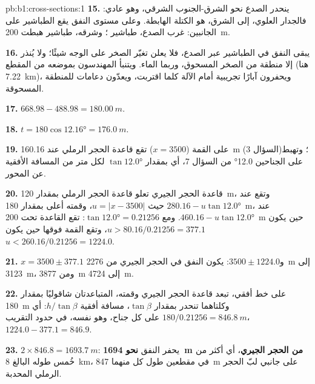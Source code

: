 \begin{solution}{pb:b1:cross-sections:1}
\textbf{15.} ينحدر الصدع نحو الشرق-الجنوب الشرقي، وهو عادي: فالجدار العلوي، إلى الشرق، هو الكتلة الهابطة. وعلى مستوى النفق يقع الطباشير على الجانبين: غرب الصدع، طباشير ؛ وشرقه، طباشير هبطت \qty{200}{m}.

\textbf{16.} يبقى النفق في الطباشير عبر الصدع، فلا يعلن تغيّر الصخر على الوجه شيئًا؛ ولا يُنذر إلا منطقة من الصخر المسحوق، وربما الماء. ويتنبأ المهندسون بموضعه من المقطع (هنا \qty{7.22}{km})، ويحفرون آبارًا تجريبية أمام الآلة كلما اقتربت، ويعدّون دعامات للمنطقة المسحوقة.

\textbf{17.} $668.98 - 488.98 = \qty{180.00}{m}$.

\textbf{18.} $t = 180\cos\ang{12.16} = \qty{176.0}{m}$.

\textbf{19.} على القمة ($x = 3500$) تقع قاعدة الحجر الرملي عند \qty{160.16}{m} (السؤال 3)؛ وتهبط على الجناحين  \ang{12.0} من السؤال 7، أي بمقدار $\tan\ang{12.0}$ لكل متر من المسافة الأفقية عن المحور.

\textbf{20.} قاعدة الحجر الجيري تعلو قاعدة الحجر الرملي بمقدار \qty{120}{m}، وتقع عند $280.16 - u\tan\ang{12.0}$ حيث $u = |x - 3500|$، وقمته أعلى بمقدار \qty{180}{m}، عند $460.16 - u\tan\ang{12.0}$. ومع $\tan\ang{12.0} =
0.21256$: تقع القاعدة تحت \qty{200}{m} حين يكون $u > 80.16/0.21256 = 377.1$، وتقع القمة فوقها حين يكون $u < 260.16/0.21256 = 1224.0$.

\textbf{21.} $x = 3500 \pm 377.1$ و$3500 \pm 1224.0$: يكون النفق في الحجر الجيري من \qty{2276}{m} إلى \qty{3123}{m}، ومن \qty{3877}{m} إلى \qty{4724}{m}.

\textbf{22.} على خط أفقي، تبعد قاعدة الحجر الجيري وقمته، المتباعدتان شاقوليًا بمقدار \qty{180}{m} وكلتاهما تنحدر بمقدار $\tan\beta$، مسافة أفقية $h/\tan\beta$: أي $180/0.21256 = \qty{846.8}{m}$ على كل جناح، وهو نفسه، في حدود التقريب، $1224.0 - 377.1 = 846.9$.

\textbf{23.} $2\times846.8 = \qty{1693.7}{m}$: يحفر النفق \textbf{نحو \qty[text-series-to-math=true]{1694}{m} من الحجر الجيري}، أي أكثر من خُمس طوله البالغ \qty{8}{km}، في مقطعين طول كل منهما \qty{847}{m} على جانبي لبّ الحجر الرملي  المحدبة.
\end{solution}

